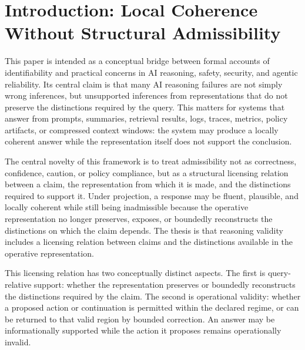 \documentclass[11pt]{article}
\begin{document}
\begin{abstract}
The goal is not to eliminate uncertainty or require abstention. It is to ensure that reasoning systems do not present conclusions as determined by a representation when the representation does not support them, or present actions as permitted when their operational validity has not been established. The resulting admissibility framework treats response form as part of structural reliability: a system should answer directly when support is preserved, reconstruct when bounded recovery is available, mark or route traceable dependencies, constrain operationally invalid continuations, and refuse or reformulate claims whose dependencies are opaque.
\end{abstract}

\section{Introduction: Local Coherence Without Structural Admissibility}

This paper is intended as a conceptual bridge between formal accounts of identifiability and practical concerns in AI reasoning, safety, security, and agentic reliability. Its central claim is that many AI reasoning failures are not simply wrong inferences, but unsupported inferences from representations that do not preserve the distinctions required by the query. This matters for systems that answer from prompts, summaries, retrieval results, logs, traces, metrics, policy artifacts, or compressed context windows: the system may produce a locally coherent answer while the representation itself does not support the conclusion.

The central novelty of this framework is to treat admissibility not as correctness, confidence, caution, or policy compliance, but as a structural licensing relation between a claim, the representation from which it is made, and the distinctions required to support it. Under projection, a response may be fluent, plausible, and locally coherent while still being inadmissible because the operative representation no longer preserves, exposes, or boundedly reconstructs the distinctions on which the claim depends. The thesis is that reasoning validity includes a licensing relation between claims and the distinctions available in the operative representation.

This licensing relation has two conceptually distinct aspects. The first is query-relative support: whether the representation preserves or boundedly reconstructs the distinctions required by the claim. The second is operational validity: whether a proposed action or continuation is permitted within the declared regime, or can be returned to that valid region by bounded correction. An answer may be informationally supported while the action it proposes remains operationally invalid.
\end{document}
